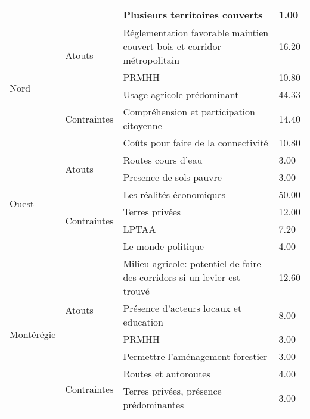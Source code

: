\begin{table}[h!]
\begin{tabular}{m{}lm{}l}
                       &                              & Plusieurs territoires couverts                      & 1.00  \\ \hline
\multirow{5}{*}{Nord} &
  \multirow{2}{*}{Atouts} &
  Réglementation favorable maintien couvert bois et corridor métropolitain &
  16.20 \\ \cline{3-4} 
                       &                              & PRMHH                                               & 10.80 \\ \cline{2-4} 
                       & \multirow{3}{*}{Contraintes} & Usage agricole prédominant                          & 44.33 \\ \cline{3-4} 
                       &                              & Compréhension et participation citoyenne            & 14.40 \\ \cline{3-4} 
                       &                              & Coûts pour faire de la connectivité                 & 10.80 \\ \hline
\multirow{6}{*}{Ouest} & \multirow{2}{*}{Atouts}      & Routes cours d'eau                                  & 3.00  \\ \cline{3-4} 
                       &                              & Presence de sols pauvre                             & 3.00  \\ \cline{2-4} 
                       & \multirow{4}{*}{Contraintes} & Les réalités économiques                            & 50.00 \\ \cline{3-4} 
                       &                              & Terres privées                                      & 12.00 \\ \cline{3-4} 
                       &                              & LPTAA                                               & 7.20  \\ \cline{3-4} 
                       &                              & Le monde politique                                  & 4.00  \\ \hline
\multirow{6}{*}{Montérégie} &
  \multirow{4}{*}{Atouts} &
  Milieu agricole: potentiel de faire des corridors si un levier est trouvé &
  12.60 \\ \cline{3-4} 
                       &                              & Présence d'acteurs locaux et education              & 8.00  \\ \cline{3-4} 
                       &                              & PRMHH                                               & 3.00  \\ \cline{3-4} 
                       &                              & Permettre l'aménagement forestier                   & 3.00  \\ \cline{2-4} 
                       & \multirow{2}{*}{Contraintes} & Routes et autoroutes                                & 4.00  \\ \cline{3-4} 
                       &                              & Terres privées, présence prédominantes              & 3.00  \\ \hline
\end{tabular}
\end{table}

